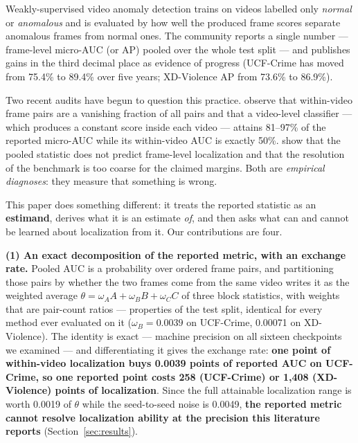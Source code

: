 \documentclass[number,preprint,12pt]{elsarticle}
\begin{document}
Weakly-supervised video anomaly detection trains on videos labelled only
\emph{normal} or \emph{anomalous} and is evaluated by how well the produced frame scores
separate anomalous frames from normal ones. The community reports a single
number --- frame-level micro-AUC (or AP) pooled over the whole test split --- and
publishes gains in the third decimal place as evidence of progress (UCF-Crime
has moved from 75.4\% to 89.4\% over five years; XD-Violence AP from 73.6\% to
86.9\%).

Two recent audits have begun to question this practice. \citet{song2026lookinside} observe that within-video frame pairs are a vanishing
fraction of all pairs and that a video-level classifier --- which produces a
constant score inside each video --- attains 81--97\% of the reported micro-AUC
while its within-video AUC is exactly 50\%. \citet{abdulaziz2026auditing} show that the pooled statistic does not predict frame-level
localization and that the resolution of the benchmark is too coarse for the
claimed margins. Both are \emph{empirical diagnoses}: they measure that something is
wrong.

This paper does something different: it treats the reported statistic as an
\textbf{estimand}, derives what it is an estimate \emph{of}, and then asks what can and
cannot be learned about localization from it. Our contributions are four.

\textbf{(1) An exact decomposition of the reported metric, with an exchange rate.}
Pooled AUC is a probability over ordered frame pairs, and partitioning those
pairs by whether the two frames come from the same video writes it as the
weighted average \(\theta=\omega_A A+\omega_B B+\omega_C C\) of three block
statistics, with weights that are pair-count ratios --- properties of the test
split, identical for every method ever evaluated on it (\(\omega_B=0.0039\) on
UCF-Crime, 0.00071 on XD-Violence). The identity is exact --- machine precision
on all sixteen checkpoints we examined --- and differentiating it gives the
exchange rate: \textbf{one point of within-video localization buys 0.0039 points of
reported AUC on UCF-Crime, so one reported point costs 258 (UCF-Crime) or 1,408
(XD-Violence) points of localization}. Since the full attainable localization
range is worth 0.0019 of \(\theta\) while the seed-to-seed noise is 0.0049, \textbf{the
reported metric cannot resolve localization ability at the precision this
literature reports} (Section~\ref{sec:results}).
\end{document}
